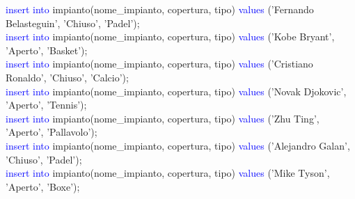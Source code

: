 \documentclass{article}
\begin{document}
\begin{flushleft}
{        \hspace*{0.5em}\textcolor{blue}{insert into} impianto(nome\_impianto, copertura, tipo) \textcolor{blue}{values} ('Fernando \hspace*{0.5em}Belasteguin', 'Chiuso', 'Padel'); \\
        \hspace*{0.5em}\textcolor{blue}{insert into} impianto(nome\_impianto, copertura, tipo) \textcolor{blue}{values} ('Kobe Bryant', \hspace*{0.5em}'Aperto', 'Basket'); \\
        \hspace*{0.5em}\textcolor{blue}{insert into} impianto(nome\_impianto, copertura, tipo) \textcolor{blue}{values} ('Cristiano \hspace*{0.5em}Ronaldo', 'Chiuso', 'Calcio'); \\
        \hspace*{0.5em}\textcolor{blue}{insert into} impianto(nome\_impianto, copertura, tipo) \textcolor{blue}{values} ('Novak Djokovic', \hspace*{0.5em}'Aperto', 'Tennis'); \\
        \hspace*{0.5em}\textcolor{blue}{insert into} impianto(nome\_impianto, copertura, tipo)
        \textcolor{blue}{values} ('Zhu Ting', \hspace*{0.5em}'Aperto', 'Pallavolo'); \\
        \hspace*{0.5em}\textcolor{blue}{insert into} impianto(nome\_impianto, copertura, tipo) \textcolor{blue}{values} ('Alejandro Galan', \hspace*{0.5em}'Chiuso', 'Padel'); \\
        \hspace*{0.5em}\textcolor{blue}{insert into} impianto(nome\_impianto, copertura, tipo) \textcolor{blue}{values} ('Mike Tyson', \hspace*{0.5em}'Aperto', 'Boxe'); \\}
    \end{flushleft}
\end{document}
